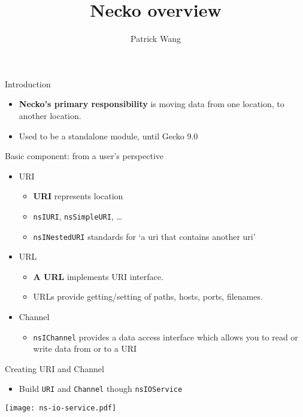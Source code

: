 \documentclass{beamer}
\title{Necko overview}
\author{Patrick Wang}
\begin{document}
\begin{frame}
  \titlepage
\end{frame}

\begin{frame}{Introduction}
  \begin{itemize}
  \item \textbf{Necko's primary responsibility} is moving data from one location,
    to another location. 
  \item Used to be a standalone module, until Gecko 9.0
  \end{itemize}
\end{frame}

\begin{frame}{Basic component: from a user's perspective}
  \begin{itemize}
  \item URI
    \begin{itemize}
    \item \textbf{URI} represents location
    \item \texttt{nsIURI}, \texttt{nsSimpleURI}, \ldots
    \item \texttt{nsINestedURI} standards for `a uri that contains another uri'
    \end{itemize}
  \item URL
    \begin{itemize}
    \item \textbf{A URL} implements URI interface.
    \item URLs provide getting/setting of paths, hosts, ports, filenames.
    \end{itemize}
  \item Channel
    \begin{itemize}
    \item \texttt{nsIChannel} provides a data access interface which allows you to read or write data from or to a URI
    \end{itemize}
  \end{itemize}
\end{frame}

\begin{frame}{Creating URI and Channel}
  \begin{itemize}
  \item Build \texttt{URI} and \texttt{Channel} though \texttt{nsIOService}
  \end{itemize}
  \begin{center}
    \texttt{[image: ns-io-service.pdf]}
  \end{center}
\end{frame}
\end{document}
